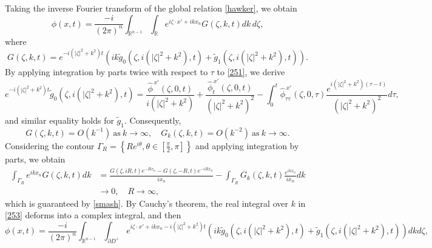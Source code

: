 \documentclass[preprint,compress,12pt]{elsarticle}
\numberwithin{equation}{section}
\begin{document}
Taking the inverse Fourier transform of the global relation \eqref{hawker}, we obtain
\begin{equation} \label{253} \phi(x,t)=\frac{-i}{(2\pi)^{n}}\int_{\mathbb{R}^{n-1}}\int_{\mathbb{R}}e^{i\zeta\cdot x'+ikx_{n}} G(\zeta,k,t) dk\, d\zeta,
\end{equation}
where\begin{equation*}
	G(\zeta,k,t)=e^{-i(|\zeta|^{2}+k^{2})t} \left(ik \widetilde{g}_{0}(\zeta,i(|\zeta|^{2}+k^{2}),t)+\widetilde{g}_{1}(\zeta,i(|\zeta|^{2}+k^{2}),t)\right).
\end{equation*}
By applying integration by parts twice with respect to $\tau$ to \eqref{251}, we derive
\begin{equation*} e^{-i(|\zeta|^{2}+k^{2})t}\widetilde{g}_{0}\left(\zeta,i(|\zeta|^{2}+k^{2}),t\right)=\frac{\widehat{\phi}^{\,x'}(\zeta,0,t)}{i(|\zeta|^{2}+k^{2})}+\frac{\widehat{\phi}^{\,x'}_{t}(\zeta,0,t)}{(|\zeta|^{2}+k^{2})^{2}}-\int_{0}^{t} \widehat{\phi}^{\,x'}_{\tau\tau}(\zeta,0,\tau)\frac{e^{i(|\zeta|^{2}+k^{2})(\tau-t)}}{(|\zeta|^{2}+k^{2})^{2}} d\tau,
\end{equation*}
and similar equality holds for $\widetilde{g}_{1}$. Consequently,
\begin{equation}\label{smash}
	G(\zeta,k,t)=O\left(k^{-1}\right) \ \text{as}\ k\rightarrow\infty, \quad	G_{k}(\zeta,k,t)= O\left(k^{-2}\right) \ \text{as} \ k\rightarrow \infty.
\end{equation}
Considering the contour $\Gamma_{R}=\left\{Re^{i\theta},\theta\in\left[\frac{\pi}{2},\pi\right]\right\}$ and applying integration by parts, we obtain
\begin{equation*}
	\begin{aligned}
		\int_{\Gamma_{R}}e^{ikx_{n}} G(\zeta,k,t)dk&=
		\frac{G(\zeta,iR,t)e^{-Rx_{n}}-G(\zeta,-R,t)e^{-iR x_{n}}}{ix_{n}}-\int_{\Gamma_{R}} G_{k}(\zeta,k,t) \frac{e^{ikx_{n}}}{ix_{n}} dk\\
		&\rightarrow0,\quad R\rightarrow\infty,
	\end{aligned}
\end{equation*}
which is guaranteed by \eqref{smash}. By Cauchy's theorem, the real integral over $k$ in \eqref{253} deforms  into a complex integral, and then
{\small\begin{equation}\label{oral}
		\phi(x,t)=\frac{-i}{(2\pi)^{n}}\int_{\mathbb{R}^{n-1}}\int_{\partial D^{+}}e^{i\zeta\cdot x'+ik x_{n}-i(|\zeta|^{2}+k^{2})t} \left(ik \widetilde{g}_{0}(\zeta,i(|\zeta|^{2}+k^{2}),t)+\widetilde{g}_{1}(\zeta,i(|\zeta|^{2}+k^{2}),t)\right) dkd\zeta,
\end{equation}}
\end{document}

